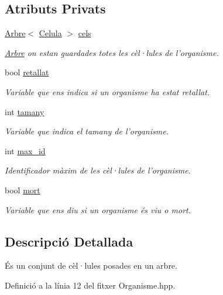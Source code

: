 \subsection*{Atributs Privats}
\begin{DoxyCompactItemize}
\item 
\hyperlink{class_arbre}{Arbre}$<$ \hyperlink{struct_organisme_1_1_celula}{Celula} $>$ \hyperlink{class_organisme_af983d9bfbaf3caf00aaaf26436aab8ff}{cels}
\begin{DoxyCompactList}\small\item\em \hyperlink{class_arbre}{Arbre} on estan guardades totes les cèl·lules de l'organisme. \end{DoxyCompactList}\item 
bool \hyperlink{class_organisme_acf912225a83570cb68542dcc6709023a}{retallat}
\begin{DoxyCompactList}\small\item\em Variable que ens indica si un organisme ha estat retallat. \end{DoxyCompactList}\item 
int \hyperlink{class_organisme_a5d30992b5ded1a9314aff94ce9fb3932}{tamany}
\begin{DoxyCompactList}\small\item\em Variable que indica el tamany de l'organisme. \end{DoxyCompactList}\item 
int \hyperlink{class_organisme_ae7f51a74f01cee155cf88a5b01545f78}{max\-\_\-id}
\begin{DoxyCompactList}\small\item\em Identificador màxim de les cèl·lules de l'organisme. \end{DoxyCompactList}\item 
bool \hyperlink{class_organisme_ae20564db8d9ba5b7547750375010ed7b}{mort}
\begin{DoxyCompactList}\small\item\em Variable que ens diu si un organisme és viu o mort. \end{DoxyCompactList}\end{DoxyCompactItemize}


\subsection{Descripció Detallada}
És un conjunt de cèl·lules posades en un arbre. 

Definició a la línia 12 del fitxer Organisme.\-hpp.



